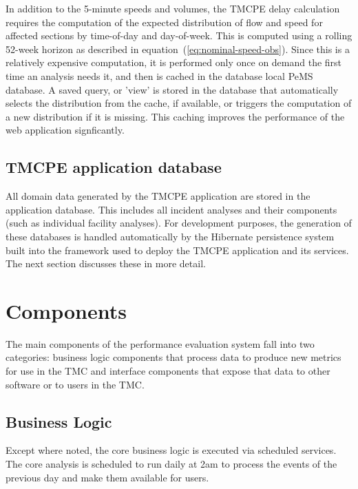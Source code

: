 \documentclass[12pt]{report}
\newcounter{time}
\begin{document}
In addition to the 5-minute speeds and volumes, the \ac{TMCPE} delay
calculation requires the computation of the expected distribution of
flow and speed for affected sections by time-of-day and day-of-week.
This is computed using a rolling 52-week horizon as described in
equation~(\ref{eq:nominal-speed-obs}).  Since this is a relatively
expensive computation, it is performed only once on demand the first
time an analysis needs it, and then is cached in the database local
\ac{PeMS} database.  A saved query, or 'view' is stored in the database
that automatically selects the distribution from the cache, if
available, or triggers the computation of a new distribution if it is
missing.  This caching improves the performance of the web application
signficantly.


\subsection{TMCPE application database}
\label{sec:tmcpe-app-database}

All domain data generated by the \ac{TMCPE} application are stored in
the application database.  This includes all incident analyses and
their components (such as individual facility analyses).  For
development purposes, the generation of these databases is handled
automatically by the Hibernate persistence system
\citep{king10:_hiber_relat_persis_idiom_java} built into the
 framework
\citep{rocher09:_grail_framew_refer_docum} used to deploy the
\ac{TMCPE} application and its services.  The next section discusses
these in more detail.


\section{Components}
\label{sec:components}

The main components of the performance evaluation system fall into two
categories: business logic components that process data to produce new
metrics for use in the \ac{TMC} and interface components that expose
that data to other software or to users in the \ac{TMC}.


\subsection{Business Logic}
\label{sec:logic}

Except where noted, the core business logic is executed via scheduled
services.  The core analysis is scheduled to run daily at 2am to
process the events of the previous day and make them available for
users.
\end{document}
